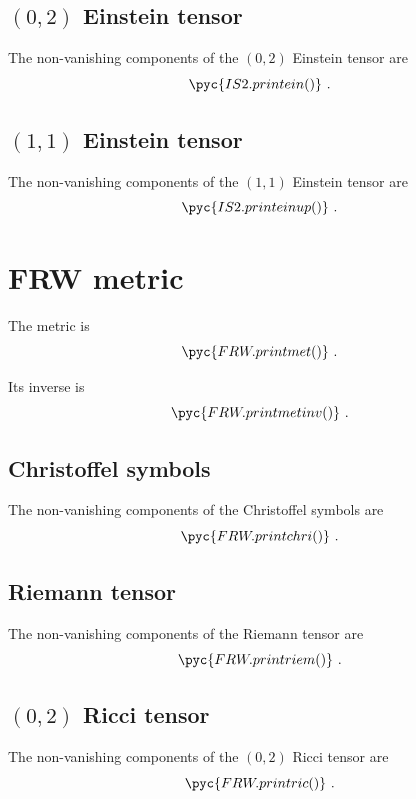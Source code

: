 \documentclass[a4paper, 12pt]{memoir}
\begin{document}
\section{$(0,2)$ Einstein tensor}
    The non-vanishing components of the $(0,2)$ Einstein tensor are
    \begin{equation*}
        \pyc{IS2.printein()} ~.
    \end{equation*}

\section{$(1,1)$ Einstein tensor}
    The non-vanishing components of the $(1,1)$ Einstein tensor are
    \begin{equation*}
        \pyc{IS2.printeinup()} ~.
    \end{equation*}

\chapter{FRW metric}

    The metric is 
    \begin{equation*}
        \pyc{FRW.printmet()} ~.
    \end{equation*}

    Its inverse is 
    \begin{equation*}
        \pyc{FRW.printmetinv()} ~.
    \end{equation*}
    
\section{Christoffel symbols}
    The non-vanishing components of the Christoffel symbols are
    \begin{equation*}
        \pyc{FRW.printchri()} ~.
    \end{equation*}

\section{Riemann tensor}
    The non-vanishing components of the Riemann tensor are
    \begin{equation*}
        \pyc{FRW.printriem()} ~.
    \end{equation*}

\section{$(0,2)$ Ricci tensor}
    The non-vanishing components of the $(0,2)$ Ricci tensor are
    \begin{equation*}
        \pyc{FRW.printric()} ~.
    \end{equation*}
\end{document}

